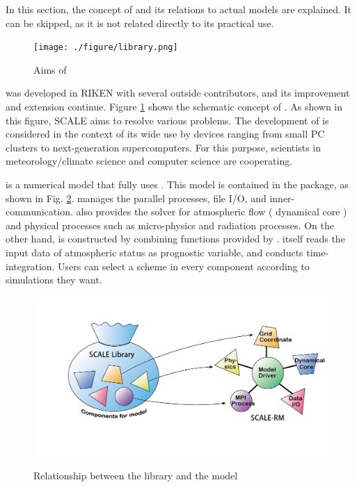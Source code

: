 In this section, the concept of \scalelib and its relations to actual models are explained. It can be skipped, as it is not related directly to its practical use.


\begin{figure}[htb]
\begin{center}
  \texttt{[image: ./figure/library.png]}\\
  \caption{Aims of \scalelib}
  \label{fig:scale}
\end{center}
\end{figure}

\scalelib was developed in RIKEN with several outside contributors,
and its improvement and extension continue.
Figure \ref{fig:scale} shows the schematic concept of \scalelib.
As shown in this figure, SCALE aims to resolve various problems.
The development of \scalelib is considered in the context of its wide use
by devices ranging from small PC clusters to next-generation supercomputers.
For this purpose, scientists in meteorology/climate science
and computer science are cooperating.

\scalerm is a numerical model that fully uses \scalelib.
This model is contained in the \scalelib package,
as shown in Fig. \ref{fig:scale-rm}.
\scalelib manages the parallel processes,
file I/O, and inner-communication.
\scalelib also provides the solver for atmospheric flow ( dynamical core )
and physical processes such as micro-physics and radiation processes.
On the other hand,
\scalerm is constructed by combining functions provided by \scalelib.
\scalerm itself reads the input data of atmospheric status as prognostic variable,
and conducts time-integration.
Users can select a scheme in every component according to simulations they want.

\begin{figure}[hbt]
\begin{center}
  \includegraphics[width=0.9\hsize]{./figure/scale.png}\\
  \caption{Relationship between the library \scalelib and the model \scalerm}
  \label{fig:scale-rm}
\end{center}
\end{figure}


